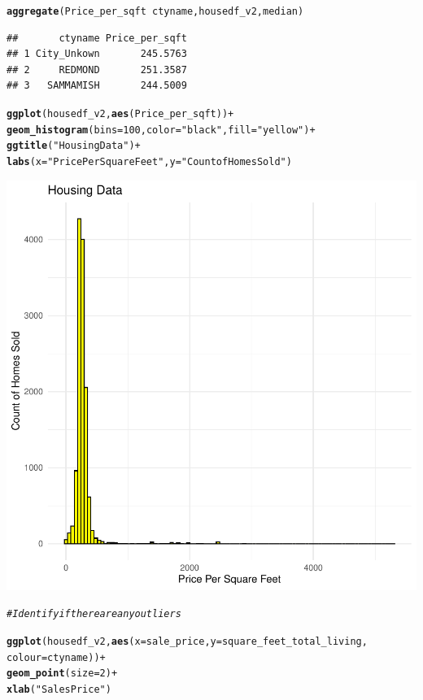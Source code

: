 \documentclass{article}\usepackage[]{graphicx}\usepackage[]{xcolor}
\makeatletter
\newcommand{\hlnum}[1]{\textcolor[rgb]{0.686,0.059,0.569}{#1}}%
\newcommand{\hlstr}[1]{\textcolor[rgb]{0.192,0.494,0.8}{#1}}%
\newcommand{\hlcom}[1]{\textcolor[rgb]{0.678,0.584,0.686}{\textit{#1}}}%
\newcommand{\hlopt}[1]{\textcolor[rgb]{0,0,0}{#1}}%
\newcommand{\hlstd}[1]{\textcolor[rgb]{0.345,0.345,0.345}{#1}}%
\newcommand{\hlkwc}[1]{\textcolor[rgb]{0.333,0.667,0.333}{#1}}%
\newcommand{\hlkwd}[1]{\textcolor[rgb]{0.737,0.353,0.396}{\textbf{#1}}}%
\newenvironment{kframe}{%
 \def\at@end@of@kframe{}%
 \ifinner\ifhmode%
  \def\at@end@of@kframe{\end{minipage}}%
  \begin{minipage}{\columnwidth}%
 \fi\fi%
 \def\FrameCommand##1{\hskip\@totalleftmargin \hskip-\fboxsep
 \colorbox{shadecolor}{##1}\hskip-\fboxsep
     \hskip-\linewidth \hskip-\@totalleftmargin \hskip\columnwidth}%
 \MakeFramed {\advance\hsize-\width
   \@totalleftmargin\z@ \linewidth\hsize
   \@setminipage}}%
 {\par\unskip\endMakeFramed%
 \at@end@of@kframe}
\newenvironment{knitrout}{}{} %
\makeatother
\begin{document}
\begin{knitrout}
\begin{kframe}
\begin{alltt}
\hlkwd{aggregate}\hlstd{(Price_per_sqft}\hlopt{~}\hlstd{ctyname,housedf_v2,median)}
\end{alltt}
\begin{verbatim}
##       ctyname Price_per_sqft
## 1 City_Unkown       245.5763
## 2     REDMOND       251.3587
## 3   SAMMAMISH       244.5009
\end{verbatim}
\begin{alltt}
\hlkwd{ggplot}\hlstd{(housedf_v2,} \hlkwd{aes}\hlstd{(Price_per_sqft))} \hlopt{+}
  \hlkwd{geom_histogram}\hlstd{(}\hlkwc{bins} \hlstd{=} \hlnum{100}\hlstd{,}\hlkwc{color} \hlstd{=} \hlstr{"black"}\hlstd{,} \hlkwc{fill} \hlstd{=} \hlstr{"yellow"}\hlstd{)} \hlopt{+}
  \hlkwd{ggtitle}\hlstd{(}\hlstr{"Housing Data"}\hlstd{)} \hlopt{+}
  \hlkwd{labs}\hlstd{(}\hlkwc{x} \hlstd{=}\hlstr{"Price Per Square Feet"}\hlstd{,} \hlkwc{y}\hlstd{=}\hlstr{"Count of Homes Sold"}\hlstd{)}
\end{alltt}
\end{kframe}

{\centering \includegraphics[width=.6\linewidth]{figure/assignment-04-02-Couto-Maria-Rnwauto-report-1} 

}


\begin{kframe}\begin{alltt}
\hlcom{# Identify if there are any outliers}

\hlkwd{ggplot}\hlstd{(housedf_v2,} \hlkwd{aes}\hlstd{(}\hlkwc{x}\hlstd{=sale_price,}\hlkwc{y}\hlstd{=square_feet_total_living,}
                       \hlkwc{colour}\hlstd{=ctyname))} \hlopt{+}
  \hlkwd{geom_point}\hlstd{(}\hlkwc{size} \hlstd{=} \hlnum{2}\hlstd{)} \hlopt{+}
  \hlkwd{xlab}\hlstd{(}\hlstr{"Sales Price"}\hlstd{)}
\end{alltt}
\end{kframe}


\end{knitrout}
\end{document}
